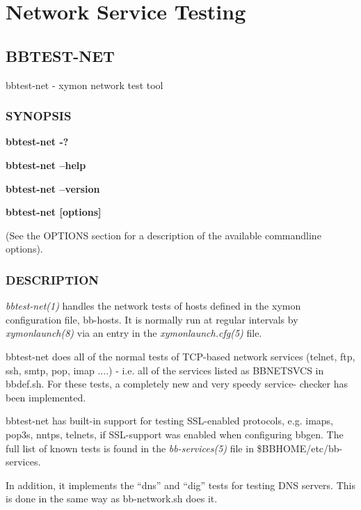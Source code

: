 %
\chapter{Network Service Testing}

%
\section{BBTEST-NET}
 bbtest-net - xymon network test tool 

\subsection{SYNOPSIS}
\textbf{bbtest-net -?}
 
\textbf{bbtest-net --help}
 
\textbf{bbtest-net --version}
 
\textbf{bbtest-net [options]}
 
 (See the OPTIONS section for a description of the available commandline options). 

 
\subsection{DESCRIPTION}
\emph{bbtest-net(1)} handles the network tests of hosts defined in the
xymon configuration file, bb-hosts. It is normally run at regular
intervals by \emph{xymonlaunch(8)} via an entry in the
\emph{xymonlaunch.cfg(5)} file. 

 bbtest-net does all of the normal tests of TCP-based network services
 (telnet, ftp, ssh, smtp, pop, imap ....) - i.e. all of the services
 listed as BBNETSVCS in bbdef.sh. For these tests, a completely new
 and very speedy service- checker has been implemented. 



  bbtest-net has built-in support for testing SSL-enabled protocols,
  e.g. imaps, pop3s, nntps, telnets, if SSL-support was enabled when
  configuring bbgen. The full list of known tests is found in the
  \emph{bb-services(5)} file in \$BBHOME/etc/bb-services. 



  In addition, it implements the ``dns'' and ``dig'' tests for testing
  DNS servers. This is done in the same way as bb-network.sh does it. 


